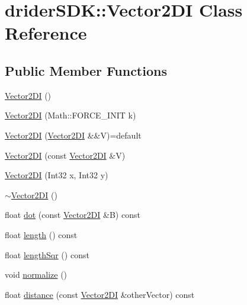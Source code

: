\hypertarget{classdrider_s_d_k_1_1_vector2_d_i}{}\section{drider\+S\+DK\+:\+:Vector2\+DI Class Reference}
\label{classdrider_s_d_k_1_1_vector2_d_i}
\subsection*{Public Member Functions}
\begin{DoxyCompactItemize}
\item 
\hyperlink{classdrider_s_d_k_1_1_vector2_d_i_a3de2b2d2a61849d145388ac375c92ca3}{Vector2\+DI} ()
\item 
\hyperlink{classdrider_s_d_k_1_1_vector2_d_i_aef25ce48b39d0680ca9395691a994aeb}{Vector2\+DI} (Math\+::\+F\+O\+R\+C\+E\+\_\+\+I\+N\+IT k)
\item 
\hyperlink{classdrider_s_d_k_1_1_vector2_d_i_a9a02f9655d1e50582b3074ef63f20350}{Vector2\+DI} (\hyperlink{classdrider_s_d_k_1_1_vector2_d_i}{Vector2\+DI} \&\&V)=default
\item 
\hyperlink{classdrider_s_d_k_1_1_vector2_d_i_aebf0d12a33a5a8f410368053ad1ed9c7}{Vector2\+DI} (const \hyperlink{classdrider_s_d_k_1_1_vector2_d_i}{Vector2\+DI} \&V)
\item 
\hyperlink{classdrider_s_d_k_1_1_vector2_d_i_ab6cf88ed6361029f8f076ebfab30e54e}{Vector2\+DI} (Int32 x, Int32 y)
\item 
\hyperlink{classdrider_s_d_k_1_1_vector2_d_i_a88d3fd76cbf3dfb77c14f6982b850201}{$\sim$\+Vector2\+DI} ()
\item 
float \hyperlink{classdrider_s_d_k_1_1_vector2_d_i_a84ebc56e4ad5fb4f6452b658af317e16}{dot} (const \hyperlink{classdrider_s_d_k_1_1_vector2_d_i}{Vector2\+DI} \&B) const
\item 
float \hyperlink{classdrider_s_d_k_1_1_vector2_d_i_a234f2acaa2aae56f6cf5d9769e9443cc}{length} () const
\item 
float \hyperlink{classdrider_s_d_k_1_1_vector2_d_i_ae17e234b21a7f350add9550712239be8}{length\+Sqr} () const
\item 
void \hyperlink{classdrider_s_d_k_1_1_vector2_d_i_aa38e987f76d6043f734dbd777c3cdda9}{normalize} ()
\item 
float \hyperlink{classdrider_s_d_k_1_1_vector2_d_i_a4e232a3f79c9fb763acebd11f8594c0d}{distance} (const \hyperlink{classdrider_s_d_k_1_1_vector2_d_i}{Vector2\+DI} \&other\+Vector) const

\end{DoxyCompactItemize}
